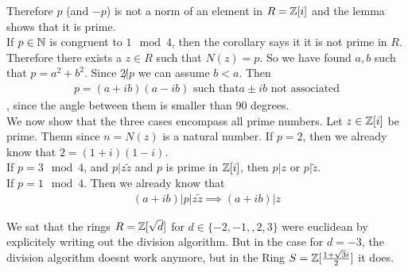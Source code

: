 Therefore $p$ (and $-p$) is not a norm of an element in $R = \mathbb{Z}[i]$ and the lemma shows that it is prime.\\

If $p \in \mathbb{N}$ is congruent to $1 \mod 4$, then the corollary says it it is not prime in $R$. Therefore there exists a $z \in R$ such that $N(z) = p$. So we have found $a,b$ such that $p = a^2 + b^2$. Since $2 \not| p$ we can assume $b < a$. Then
\begin{align*}
	p = (a + ib)(a-ib) \text{ such that} a \pm ib \text{ not associated}
\end{align*}
, since the angle between them is smaller than 90 degrees.\\

We now show that the three cases encompass all prime numbers. Let $z \in \mathbb{Z}[i]$ be prime. Thenn since $n = N(z)$ is a natural number. If $p = 2$, then we already know that $2 = (1+i)(1-i)$.\\
If $p = 3 \mod 4$, and $p | z \tilde{z}$ and $p$ is prime in $\mathbb{Z}[i]$, then $p | z$ or $p | \tilde{z}$.\\
If $p = 1 \mod 4$. Then we already know that
\begin{align*}
	(a + ib) | p | z \tilde{z} \implies (a + ib) | z
\end{align*}

We sat that the rings $R = \mathbb{Z}[\sqrt{d}]$ for $d \in \{-2,-1,,2,3\}$ were euclidean by explicitely writing out the division algorithm. But in the case for $d = -3$, the division algorithm doesnt work anymore, but in the Ring $S = \mathbb{Z}[\frac{1 + \sqrt{3}i}{2}]$ it does.





